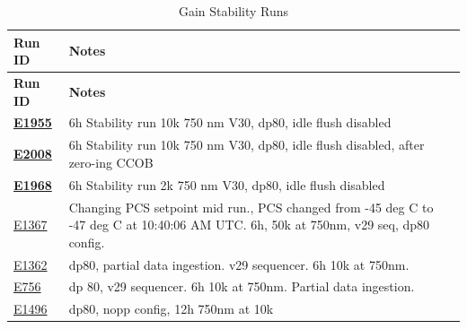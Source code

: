 \begin{longtable}{|p{5.0cm}|p{8.5cm}|}
\caption{Gain Stability Runs}\label{table:runs_gainStability} \\
\hline
\textbf{Run ID} & \textbf{Notes} \\ \hline
\endfirsthead
\hline
\textbf{Run ID} & \textbf{Notes} \\ \hline
\endhead
\hline
\endfoot
\hline
\endlastfoot

\textbf{\href{https://s3df.slac.stanford.edu/data/rubin/lsstcam/E1955/w_2024_35/}{E1955}} & 6h Stability run 10k 750 nm V30, dp80, idle flush disabled \\ \hline
\textbf{\href{https://s3df.slac.stanford.edu/data/rubin/lsstcam/E2008/w_2024_35/}{E2008}} & 6h Stability run 10k 750 nm V30, dp80, idle flush disabled, after zero-ing CCOB \\ \hline
\textbf{\href{https://s3df.slac.stanford.edu/data/rubin/lsstcam/E1968/w_2024_35/}{E1968}} & 6h Stability run 2k 750 nm V30, dp80, idle flush disabled \\ \hline
\href{https://s3df.slac.stanford.edu/data/rubin/lsstcam/E1367/w_2024_35/}{E1367} & Changing PCS setpoint mid run., PCS changed from -45 deg C to -47 deg C at 10:40:06 AM UTC. 6h, 50k at 750nm, v29 seq, dp80 config. \\ \hline
\href{https://s3df.slac.stanford.edu/data/rubin/lsstcam/E1362/w_2024_35/}{E1362} & dp80, partial data ingestion. v29 sequencer. 6h 10k at 750nm. \\ \hline
\href{https://s3df.slac.stanford.edu/data/rubin/lsstcam/E756/w_2024_35/}{E756} & dp 80, v29 sequencer. 6h 10k at 750nm. Partial data ingestion. \\ \hline
\href{https://s3df.slac.stanford.edu/data/rubin/lsstcam/E1496/w_2024_35/}{E1496} & dp80, nopp config, 12h 750nm at 10k \\ \hline

\end{longtable}

